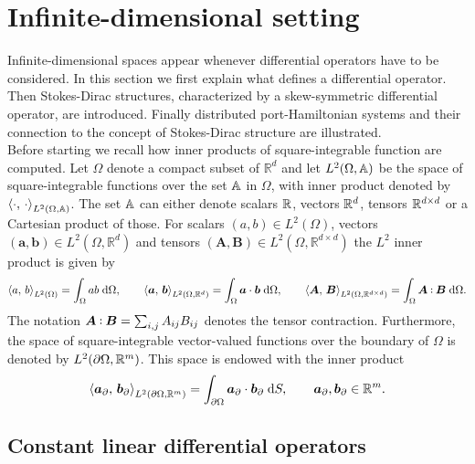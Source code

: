 \section{Infinite-dimensional setting}

Infinite-dimensional spaces appear whenever differential operators have to be considered. In this section we first explain what defines a differential operator. Then Stokes-Dirac structures, characterized by a skew-symmetric differential operator, are introduced. Finally distributed port-Hamiltonian systems and their connection to the concept of Stokes-Dirac structure are illustrated. \\


Before starting we recall how inner products of square-integrable function are computed. Let $\Omega$ denote a compact subset of $\mathbb{R}^d$  and let $L^2(\Omega, \bbA)$ be the space of square-integrable functions over the set $\bbA$ in $\Omega$, with inner product  denoted by $\inner[L^2(\Omega, \bbA)]{\cdot}{\cdot}$. The set $\bbA$ can either denote scalars $\bbR$, vectors $\bbR^d$,  tensors $\bbR^{d \times d}$ or a Cartesian product of those.  For scalars $(a,b) \in L^2(\Omega)$, vectors $(\bm{a}, \bm{b})\in L^2(\Omega, \mathbb{R}^d)$ and tensors  $(\bm{A}, \bm{B}) \in L^2(\Omega,\mathbb{R}^{d\times d})$ the $L^2$ inner product is given by 
\begin{equation}
\inner[L^2(\Omega)]{a}{b} = \int_{\Omega} a b \d\Omega, \qquad \inner[L^2(\Omega, \mathbb{R}^d)]{\bm{a}}{\bm{b}} = \int_{\Omega} \bm{a} \cdot \bm{b} \d\Omega, \qquad \inner[L^2(\Omega, \mathbb{R}^{d \times d})]{\bm{A}}{\bm{B}} = \int_{\Omega} \bm{A} \cddot \bm{B} \d\Omega.
\end{equation} 
The notation $\bm{A}\cddot \bm{B} = \sum_{i, j} A_{ij} B_{ij}$ denotes the tensor contraction.  Furthermore, the space of square-integrable vector-valued functions over the boundary of $\Omega$ is denoted by $L^2(\partial\Omega, \bbR^m)$. This space is endowed with the inner product
\begin{equation}
\inner[L^2(\partial\Omega, \mathbb{R}^m)]{\bm{a}_\partial}{\bm{b}_\partial} = \int_{\partial\Omega} \bm{a}_\partial \cdot \bm{b}_\partial \d{S}, \qquad \bm{a}_\partial, \bm{b}_\partial \in \mathbb{R}^m.
\end{equation}


\subsection{Constant linear differential operators}

